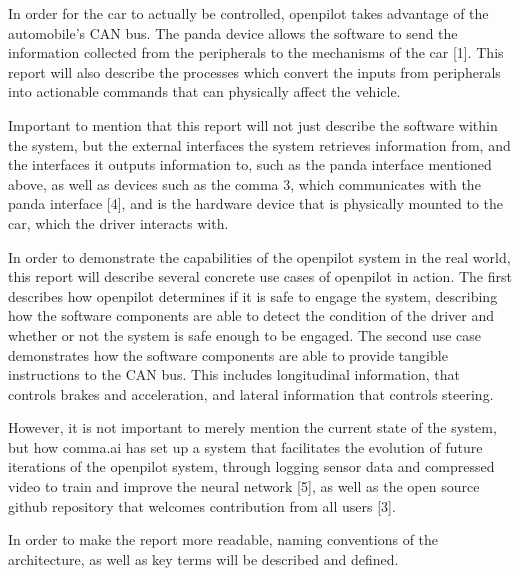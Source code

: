 \documentclass[12pt]{article}
\begin{document}
In order for the car to actually be controlled, openpilot takes advantage of the automobile’s CAN bus. The panda device allows the software to send the information collected from the peripherals to the mechanisms of the car [1]. This report will also describe the processes which convert the inputs from peripherals into actionable commands that can physically affect the vehicle.

Important to mention that this report will not just describe the software within the system, but the external interfaces the system retrieves information from, and the interfaces it outputs information to, such as the panda interface mentioned above, as well as devices such as the comma 3, which communicates with the panda interface [4], and is the hardware device that is physically mounted to the car, which the driver interacts with.

In order to demonstrate the capabilities of the openpilot system in the real world, this report will describe several concrete use cases of openpilot in action. The first describes how openpilot determines if it is safe to engage the system, describing how the software components are able to detect the condition of the driver and whether or not the system is safe enough to be engaged. The second use case demonstrates how the software components are able to provide tangible instructions to the CAN bus. This includes longitudinal information, that controls brakes and acceleration, and lateral information that controls steering.

However, it is not important to merely mention the current state of the system, but how comma.ai has set up a system that facilitates the evolution of future iterations of the openpilot system, through logging sensor data and compressed video to train and improve the neural network [5], as well as the open source github repository that welcomes contribution from all users [3].

In order to make the report more readable, naming conventions of the architecture, as well as key terms will be described and defined.
\end{document}
